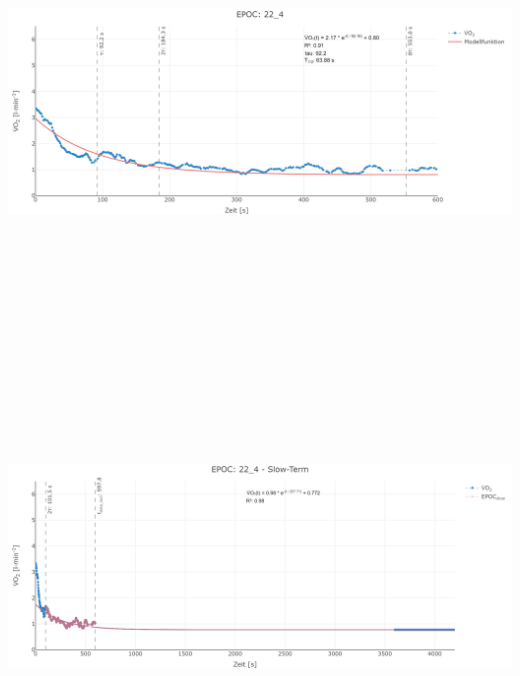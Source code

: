 \documentclass[
  letterpaper,
  DIV=11]{scrartcl}
\begin{document}
\includegraphics[width=11.45833in,height=4.6875in]{images/22_4_tau.png}
\includegraphics[width=11.45833in,height=4.6875in]{images/22_4_slow.png}
\end{document}
